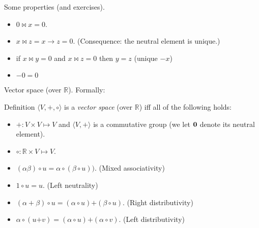 \documentclass{beamer}
\begin{document}
\begin{frame}{Some properties (and exercises).}
  \begin{itemize}
  \item $0 \bowtie x = 0$.
  \item $x \bowtie z = x \rightarrow z = 0$. (Consequence: the neutral element is unique.)
  \item if $x \bowtie y = 0$ and $x \bowtie z = 0$ then $y = z$ (unique $-x$)
  \item $-0 = 0$
  \end{itemize}
\end{frame}


\begin{frame}{Vector space (over $\mathbb{R}$).}
  Formally:
  
  \begin{block}{Definition}
    $\langle V, {\mathbin{\textbf{+}}}, \circ \rangle$ is a \emph{vector space} (over $\mathbb{R}$) iff all of the following holds:
    \begin{itemize}
    \item ${\mathbin{\textbf{+}}}: V \times V \mapsto V$ and $\langle V, {\mathbin{\textbf{+}}} \rangle$ is a commutative group (we let ${\bf 0}$ denote its neutral element).
    \item ${\circ}: \mathbb{R} \times V \mapsto V$.
    \item $(\alpha \beta) \circ u = \alpha \circ (\beta \circ u))$. (Mixed associativity)
    \item $1 \circ u = u$. (Left neutrality)
    \item $(\alpha + \beta) \circ u = (\alpha \circ u) \mathbin{\textbf{+}} (\beta \circ u)$. (Right distributivity)
    \item $\alpha \circ (u\mathbin{\textbf{+}}v) = (\alpha \circ u) \mathbin{\textbf{+}} (\alpha \circ v)$. (Left distributivity)
    \end{itemize}
  \end{block}
\end{frame}
\end{document}
